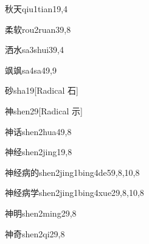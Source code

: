 \begin{verbete}{秋天}{qiu1tian1}{9,4}
\end{verbete}

\begin{verbete}{柔软}{rou2ruan3}{9,8}
\end{verbete}

\begin{verbete}{洒水}{sa3shui3}{9,4}
\end{verbete}

\begin{verbete}{飒飒}{sa4sa4}{9,9}
\end{verbete}

\begin{verbete}{砂}{sha1}{9}[Radical 石]
\end{verbete}

\begin{verbete}{神}{shen2}{9}[Radical 示]
\end{verbete}

\begin{verbete}{神话}{shen2hua4}{9,8}
\end{verbete}

\begin{verbete}{神经}{shen2jing1}{9,8}
\end{verbete}

\begin{verbete}{神经病的}{shen2jing1bing4de5}{9,8,10,8}
\end{verbete}

\begin{verbete}{神经病学}{shen2jing1bing4xue2}{9,8,10,8}
\end{verbete}

\begin{verbete}{神明}{shen2ming2}{9,8}
\end{verbete}

\begin{verbete}{神奇}{shen2qi2}{9,8}
\end{verbete}

